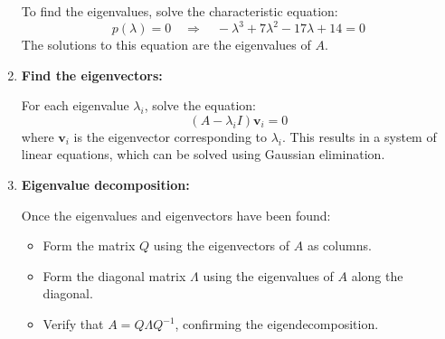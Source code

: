 \begin{process}
\begin{enumerate}
        To find the eigenvalues, solve the characteristic equation:
        \[
        p(\lambda) = 0 \quad \Rightarrow \quad -\lambda^3 + 7\lambda^2 - 17\lambda + 14 = 0
        \]
        The solutions to this equation are the eigenvalues of \( A \).
    
        \item \textbf{Find the eigenvectors:}
        
        For each eigenvalue \( \lambda_i \), solve the equation:
        \[
        (A - \lambda_i I) \mathbf{v}_i = 0
        \]
        where \( \mathbf{v}_i \) is the eigenvector corresponding to \( \lambda_i \). This results in a system of linear equations, which can be solved using Gaussian elimination.
    
        \item \textbf{Eigenvalue decomposition:}
        
        Once the eigenvalues and eigenvectors have been found:
        \begin{itemize}
            \item Form the matrix \( Q \) using the eigenvectors of \( A \) as columns.
            \item Form the diagonal matrix \( \Lambda \) using the eigenvalues of \( A \) along the diagonal.
            \item Verify that \( A = Q \Lambda Q^{-1} \), confirming the eigendecomposition.
        \end{itemize}
    
    \end{enumerate}
\end{process}

